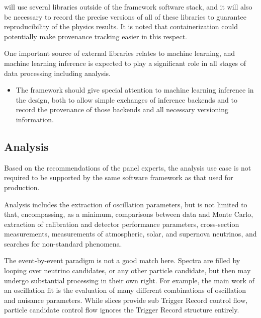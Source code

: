 \documentclass[../main-v1.tex]{subfiles}
\begin{document}
 will use several libraries outside of the framework software stack, and it will also be necessary to record the precise versions of all of these libraries to guarantee reproducibility of the physics results.  It is noted that containerization could potentially make provenance tracking easier in this respect.  



One important source of external libraries relates to machine learning, and machine learning inference is expected to play a significant role in all stages of data processing including analysis.  

\begin{itemize}
\item The framework should give special attention to machine learning inference in the design, both to allow simple exchanges of inference backends and to record the provenance of those backends and all necessary versioning information.



\end{itemize}


\subsection{Analysis}

Based on the recommendations of the  panel experts, the analysis use case is not required to be supported by the same software framework as that used for production.


Analysis includes the extraction of oscillation parameters, but is not limited to that, encompassing, as a minimum, comparisons between data and Monte Carlo, extraction of calibration and detector performance parameters, cross-section measurements, measurements of atmospheric, solar, and supernova neutrinos, and searches for non-standard phenomena.

The event-by-event paradigm is not a good match here. Spectra are filled by looping over neutrino candidates, or any other particle candidate, but then may undergo substantial processing in their own right. For example, the main work of an oscillation fit is the evaluation of many different combinations of oscillation and nuisance parameters.  While slices provide sub Trigger Record control flow, particle candidate control flow ignores the Trigger Record structure entirely.
\end{document}
